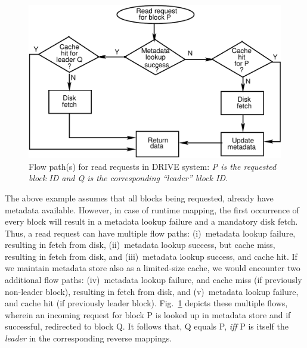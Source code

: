 \begin{figure}[t]
    \centering
    \includegraphics[scale=0.65]{confided-figures/main/dedup-working-readflowcomp.pdf}
    \caption{Flow path(s) for read requests in DRIVE system: \textit{P is the requested block ID and Q is the corresponding ``leader'' block ID.}}
    \label{fig:confided-working(b)}
\end{figure}

The above example assumes that all blocks being requested, already
have metadata available. However, in case of
runtime mapping, the first occurrence of every block will result in a
metadata lookup failure and a mandatory disk fetch.
Thus, a read request can have multiple flow paths:
(i)~metadata lookup failure, resulting in fetch from disk,
(ii)~metadata lookup success, but cache miss, resulting in fetch from disk, and
(iii)~metadata lookup success, and cache hit.
If we maintain metadata store also as a limited-size cache, 
we would encounter two additional flow paths:
(iv)~metadata lookup failure, and cache miss (if previously 
non-leader block), resulting in fetch from disk, and
(v)~metadata lookup failure, and cache hit (if previously leader block).
Fig.~\ref{fig:confided-working(b)} depicts these multiple flows,
wherein an incoming request for block P is looked up in metadata store and if
successful, redirected to block Q. It follows that, Q equals P, \textit{iff}
P is itself the \textit{leader} in the corresponding reverse mappings.

